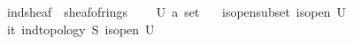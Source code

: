 \documentclass[12pt]{scrartcl}
\begin{document}
\begin{isabelle}
\isamarkupfalse%
\ ind{\isacharunderscore}{\kern0pt}sheaf\ {\isacharequal}{\kern0pt}\ sheaf{\isacharunderscore}{\kern0pt}of{\isacharunderscore}{\kern0pt}rings\ {\isacharplus}{\kern0pt}\isanewline
\ \ \ U{\isacharcolon}{\kern0pt}{\isacharcolon}{\kern0pt}\ {\isachardoublequoteopen}{\isacharprime}{\kern0pt}a\ set{\isachardoublequoteclose}\isanewline
\ \ \ is{\isacharunderscore}{\kern0pt}open{\isacharunderscore}{\kern0pt}subset{\isacharcolon}{\kern0pt}\ {\isachardoublequoteopen}is{\isacharunderscore}{\kern0pt}open\ U{\isachardoublequoteclose}\isanewline
{}\isanewline
\isanewline
{}\isamarkupfalse%
\ it{\isacharcolon}{\kern0pt}\ ind{\isacharunderscore}{\kern0pt}topology\ S\ is{\isacharunderscore}{\kern0pt}open\ U\isanewline


\end{isabelle}
\end{document}
